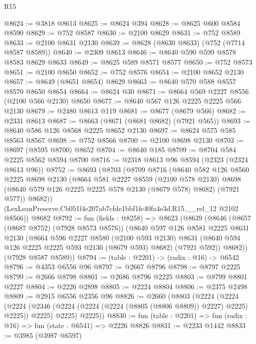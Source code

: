 \begin{lexlean}{R15}
\begin{coremodule}
@8624 := @3818 @8613
@8625 := @8624 @394
@8628 := @8625 @600 @8584 @8590
@8629 := @752 @8587
@8630 := @2100 @8629
@8631 := @752 @8589
@8633 := @2100 @8631 @2130
@8639 := @8628 (@8630 @8633) (@752 (@7714 @8587 @8589))
@8640 := @2309 @8613
@8646 := @8640 @590 @599 @8578 @8583 @8629 @8633
@8649 := @8625 @589 @8571 @8577
@8650 := @752 @8573
@8651 := @2100 @8650
@8652 := @752 @8576
@8654 := @2100 @8652 @2130
@8657 := @8649 (@8651 @8654) @8629
@8663 := @8640 @570 @588 @8557 @8570 @8650 @8654
@8664 := @8624 @30
@8671 := @8664 @569 @2227 @8556 (@2100 @566 @2130) @8650
@8677 := @8640 @567 @126 @2225 @2225 @566 @2130
@8679 := @2480 @8613 @119
@8681 := @8677 (@8679 @566)
@8682 := @2331 @8613
@8687 := @8663 (@8671 (@8681 @8682) (@7921 @565))
@8693 := @8640 @586 @126 @8568 @2225 @8652 @2130
@8697 := @8624 @575 @585 @8563 @8567
@8698 := @752 @8566
@8700 := @2100 @8698 @2130
@8703 := @8697 (@8595 @8700) @8652
@8704 := @8640 @185
@8709 := @8704 @584 @2225 @8562 @8594 @8700
@8716 := @2318 @8613 @96 @8594 (@2323 (@2324 @8613 @96))
@8752 := @8693
    (@8703
      (@8709
        @8716
        (@8640
          @582
          @126
          @8560
          @2225
          @8698
          @2130
          (@8664
            @581
            @2227
            @8559
            (@2100 @578 @2130)
            @8698
            (@8640 @579 @126 @2225 @2225 @578 @2130 (@8679 @578) @8682)
            (@7921 @577))
          @8682))
      (LexLeanPreserve.Cb051f4e207ab7cfde1bbf1fe40fa4e3d.R15.__rel_12 @2102 @8566))
    @8682
@8792 := fun (fields : @8258) =>
  @8623
    (@8639
      (@8646
        (@8657 (@8687 @8752) (@7928 @8573 @8576))
        (@8640
          @597
          @126
          @8581
          @2225
          @8631
          @2130
          (@8664
            @596
            @2227
            @8580
            (@2100 @593 @2130)
            @8631
            (@8640 @594 @126 @2225 @2225 @593 @2130 (@8679 @593) @8682)
            (@7921 @592))
          @8682))
      (@7928 @8587 @8589))
@8794 := (table : @2201) -> (radix : @16) -> @6542
@8796 := @4353 @6556 @96
@8797 := @2667 @8796
@8798 := @8797 @2225
@8799 := @2666 @8798
@8801 := @2686 @8796 @2225
@8803 := @8799 @8801 @2227
@8804 := @2226 @2898
@8805 := @2224 @8804
@8806 := @2375 @2498
@8809 := @2915 @6556 @2356 @96
@8826 := @2660
    (@8803
      (@2224
        (@2224
          (@2224 (@2346 (@2224 (@2224 (@2224 (@8805 (@8806 @8809)) @2227) @2225) @2225)) @2225)
          @2225)
        @2225))
@8830 := fun (table : @2201) => fun (radix : @16) => fun (state : @6541) => @2226 @8826
@8831 := @2233 @1442
@8833 := @3985 (@3987 @6597)

\end{coremodule}
\end{lexlean}
